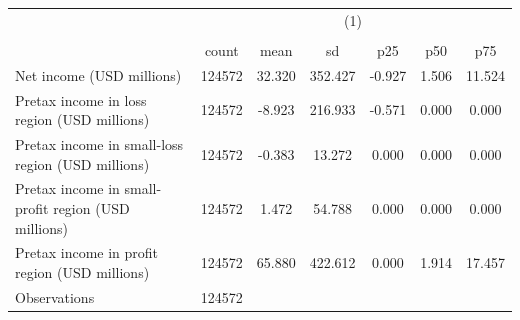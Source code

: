 {
\def\sym#1{\ifmmode^{#1}\else\(^{#1}\)\fi}
\begin{tabular}{l*{1}{cccccc}}
\hline\hline
                    &\multicolumn{6}{c}{(1)}                                                      \\
                    &\multicolumn{6}{c}{}                                                         \\
                    &       count&        mean&          sd&         p25&         p50&         p75\\
\hline
Net income (USD millions)&      124572&      32.320&     352.427&      -0.927&       1.506&      11.524\\
Pretax income in loss region (USD millions)&      124572&      -8.923&     216.933&      -0.571&       0.000&       0.000\\
Pretax income in small-loss region (USD millions)&      124572&      -0.383&      13.272&       0.000&       0.000&       0.000\\
Pretax income in small-profit region (USD millions)&      124572&       1.472&      54.788&       0.000&       0.000&       0.000\\
Pretax income in profit region (USD millions)&      124572&      65.880&     422.612&       0.000&       1.914&      17.457\\
\hline
Observations        &      124572&            &            &            &            &            \\
\hline\hline
\end{tabular}
}
